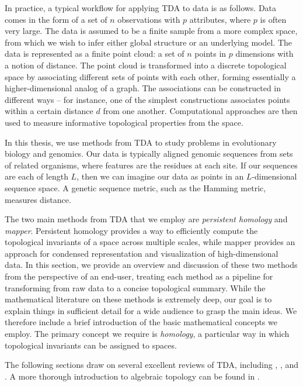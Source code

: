 In practice, a typical workflow for applying TDA to data is as follows.
Data comes in the form of a set of $n$ observations with $p$ attributes, where $p$ is often very large.
The data is assumed to be a finite sample from a more complex space, from which we wish to infer either global structure or an underlying model.
The data is represented as a finite point cloud: a set of $n$ points in $p$ dimensions with a notion of distance.
The point cloud is transformed into a discrete topological space by associating different sets of points with each other, forming essentially a higher-dimensional analog of a graph.
The associations can be constructed in different ways -- for instance, one of the simplest constructions associates points within a certain distance $d$ from one another.
Computational approaches are then used to measure informative topological properties from the space.

In this thesis, we use methods from TDA to study problems in evolutionary biology and genomics.
Our data is typically aligned genomic sequences from sets of related organisms, where features are the residues at each site.
If our sequences are each of length $L$, then we can imagine our data as points in an $L$-dimensional sequence space.
A genetic sequence metric, such as the Hamming metric, measures distance.

The two main methods from TDA that we employ are \emph{persistent homology} and \emph{mapper}.
Persistent homology provides a way to efficiently compute the topological invariants of a space across multiple scales, while mapper provides an approach for condensed representation and visualization of high-dimensional data.
In this section, we provide an overview and discussion of these two methods from the perspective of an end-user, treating each method as a pipeline for transforming from raw data to a concise topological summary.
While the mathematical literature on these methods is extremely deep, our goal is to explain things in sufficient detail for a wide audience to grasp the main ideas.
We therefore include a brief introduction of the basic mathematical concepts we employ.
The primary concept we require is \emph{homology}, a particular way in which topological invariants can be assigned to spaces.

The following sections draw on several excellent reviews of TDA, including \cite{Carlsson:2009a}, \cite{Edelsbrunner:2010}, and \cite{Ghrist:2008}.
A more thorough introduction to algebraic topology can be found in \cite{Hatcher:2002ut}.


